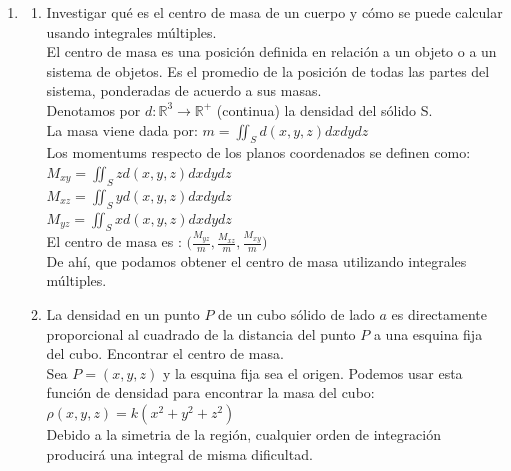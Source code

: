 \documentclass{article}
\begin{document}
\begin{enumerate}
{		El volúmen es de $4\pi $\\
		
    }

   \item {
    \begin{enumerate}
	\item
	Investigar qué es el centro de masa de un cuerpo y cómo se puede calcular usando integrales múltiples.\\	
	
	El centro de masa es una posición definida en relación a un objeto o a un sistema de objetos. Es el promedio de la posición de todas las partes del sistema, ponderadas de acuerdo a sus masas.\\
	
	Denotamos por $d : \mathbb{R}^3 \rightarrow \mathbb{R}^+$ (continua) la densidad del sólido S.\\
	
	La masa viene dada por:	$m = \iint_S d(x,y,z)dxdydz$\\
	
	Los momentums respecto de los planos coordenados se definen como:\\
	$M_{xy} = \iint_S zd(x,y,z)dxdydz$\\
	$M_{xz} = \iint_S yd(x,y,z)dxdydz$\\
	$M_{yz} = \iint_S xd(x,y,z)dxdydz$\\
	
	El centro de masa es : $\Big(\frac{M_{yz}}{m},\frac{M_{xz}}{m},\frac{M_{xy}}{m} \Big)$\\
	
	De ahí, que podamos obtener el centro de masa utilizando integrales múltiples.\\	
	
	\item    
	La densidad en un punto $P$ de un cubo sólido de lado $a$ es directamente proporcional al cuadrado de la distancia del punto $P$ a una esquina fija del cubo. Encontrar el centro de masa.\\    

Sea $P = (x,y,z)$ y la esquina fija sea el origen. Podemos usar esta función de densidad para encontrar la masa del cubo:\\
$\rho(x,y,z) = k(x^2 + y^2 + z^2)$\\
Debido a la simetria de la región, cualquier orden de integración producirá una integral de misma dificultad.\\


\end{enumerate}}
\end{enumerate}
\end{document}
